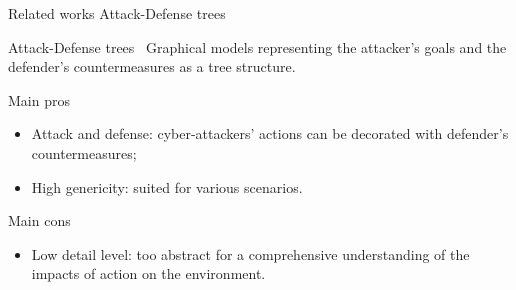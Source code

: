 	\begin{frame}{Related works}
		{Attack-Defense trees}

            \begin{block}{Attack-Defense trees~\cite{BKordy2010}}
                Graphical models representing the attacker's goals and the defender's countermeasures as a tree structure.
            \end{block}

            \begin{prosblock}{Main pros}
                \begin{itemize}
                    \item Attack and defense: cyber-attackers' actions can be decorated with defender's countermeasures;
                    \item High genericity: suited for various scenarios.
                \end{itemize}
            \end{prosblock}

            \begin{consblock}{Main cons}
                \begin{itemize}
                    \item Low detail level: too abstract for a comprehensive understanding of the impacts of action on the environment.
                \end{itemize}
            \end{consblock}

	\end{frame}

